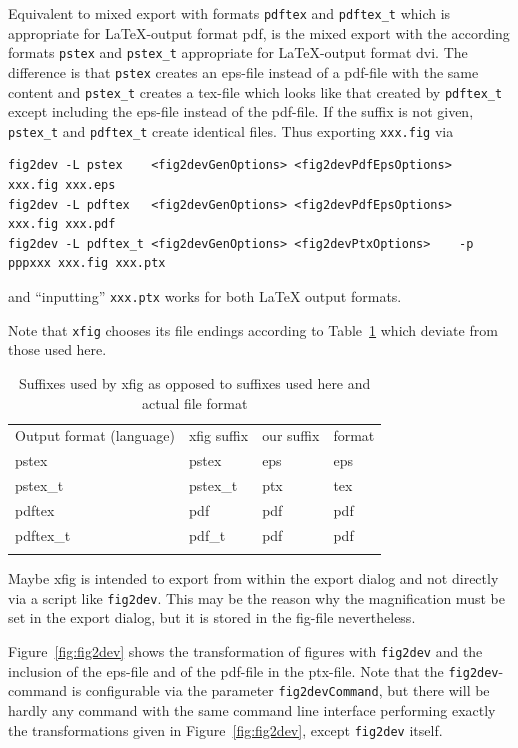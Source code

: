 \documentclass[12pt]{book}
\begin{document}
Equivalent to mixed export with formats {\tt pdftex} and {\tt pdftex\_t} 
which is appropriate for \LaTeX-output format pdf, 
is the mixed export with the according formats 
{\tt pstex} and {\tt pstex\_t} appropriate for \LaTeX-output format dvi. 
The difference is that {\tt pstex} creates an eps-file instead of a pdf-file 
with the same content 
and {\tt pstex\_t} creates a tex-file which looks like that 
created by {\tt pdftex\_t} except including the eps-file 
instead of the pdf-file. 
If the suffix is not given, 
{\tt pstex\_t} and {\tt pdftex\_t} create identical files. 
Thus exporting {\tt xxx.fig} via 
%
\begin{Verbatim}[fontsize=\scriptsize]
fig2dev -L pstex    <fig2devGenOptions> <fig2devPdfEpsOptions>           xxx.fig xxx.eps   
fig2dev -L pdftex   <fig2devGenOptions> <fig2devPdfEpsOptions>           xxx.fig xxx.pdf   
fig2dev -L pdftex_t <fig2devGenOptions> <fig2devPtxOptions>    -p pppxxx xxx.fig xxx.ptx
\end{Verbatim}
%
and ``inputting'' {\tt xxx.ptx} works for both \LaTeX{} output formats. 


Note that {\tt xfig} chooses its file endings 
according to Table~\ref {tab:xfigSuffixes} 
which deviate from those used here. 

\begin{longtable}{|l|lll|}
\hline
Output format (language) & xfig suffix & our suffix & format \\
pstex                    & pstex       & eps        & eps \\
pstex\_t                 & pstex\_t    & ptx        & tex \\
pdftex                   & pdf         & pdf        & pdf \\
pdftex\_t                & pdf\_t      & pdf        & pdf \\
\hline
\caption{\label{tab:xfigSuffixes} Suffixes used by xfig as opposed to suffixes
  used here and actual file format }
\end{longtable}


Maybe xfig is intended to export from within the export dialog 
and not directly via a script like {\tt fig2dev}. 
This may be the reason 
why the magnification must be set in the export dialog, 
but it is stored in the fig-file nevertheless. 

Figure~\ref{fig:fig2dev} shows the transformation 
of figures with {\tt fig2dev} 
and the inclusion of the eps-file and of the pdf-file in the ptx-file. 
Note that the {\tt fig2dev}-command is configurable 
via the parameter {\tt fig2devCommand}, 
but there will be hardly any command with the same command line interface 
performing exactly the transformations given in Figure~\ref{fig:fig2dev}, 
except {\tt fig2dev} itself. 
\end{document}
